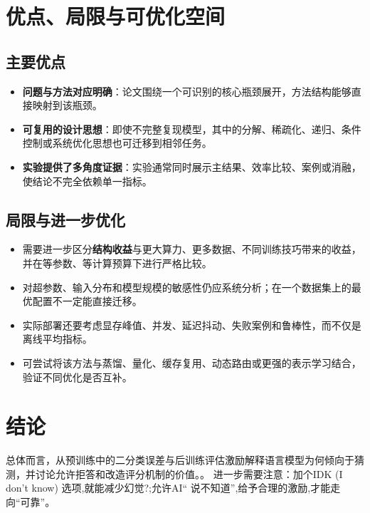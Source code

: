 \documentclass[UTF8,11pt,a4paper]{ctexart}
\newcommand{\term}[1]{\textbf{\textcolor{mainblue}{#1}}}
\begin{document}
\section{优点、局限与可优化空间}
\subsection{主要优点}
\begin{itemize}
\item \term{问题与方法对应明确}：论文围绕一个可识别的核心瓶颈展开，方法结构能够直接映射到该瓶颈。
\item \term{可复用的设计思想}：即使不完整复现模型，其中的分解、稀疏化、递归、条件控制或系统优化思想也可迁移到相邻任务。
\item \term{实验提供了多角度证据}：实验通常同时展示主结果、效率比较、案例或消融，使结论不完全依赖单一指标。
\end{itemize}

\subsection{局限与进一步优化}
\begin{itemize}
\item 需要进一步区分\term{结构收益}与更大算力、更多数据、不同训练技巧带来的收益，并在等参数、等计算预算下进行严格比较。
\item 对超参数、输入分布和模型规模的敏感性仍应系统分析；在一个数据集上的最优配置不一定能直接迁移。
\item 实际部署还要考虑显存峰值、并发、延迟抖动、失败案例和鲁棒性，而不仅是离线平均指标。
\item 可尝试将该方法与蒸馏、量化、缓存复用、动态路由或更强的表示学习结合，验证不同优化是否互补。
\end{itemize}

\section{结论}
总体而言，从预训练中的二分类误差与后训练评估激励解释语言模型为何倾向于猜测，并讨论允许拒答和改造评分机制的价值。。 进一步需要注意：加个IDK (I don't know) 选项,就能减少幻觉?;允许AI“ 说不知道”,给予合理的激励,才能走向“可靠”。
\end{document}
